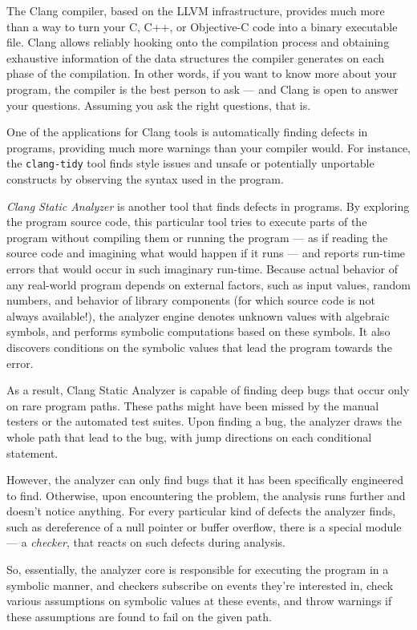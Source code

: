 \documentclass[a4paper,12pt]{article}
\begin{document}
The Clang compiler, based on the LLVM infrastructure, provides much more than a way to turn your C, C++, or Objective-C code into a binary executable file. Clang allows reliably hooking onto the compilation process and obtaining exhaustive information of the data structures the compiler generates on each phase of the compilation. In other words, if you want to know more about your program, the compiler is the best person to ask --- and Clang is open to answer your questions. Assuming you ask the right questions, that is.

One of the applications for Clang tools is automatically finding defects in programs, providing much more warnings than your compiler would. For instance, the \lstinline|clang-tidy| tool finds style issues and unsafe or potentially unportable constructs by observing the syntax used in the program.

\emph{Clang Static Analyzer} is another tool that finds defects in programs. By exploring the program source code, this particular tool tries to execute parts of the program without compiling them or running the program --- as if reading the source code and imagining what would happen if it runs --- and reports run-time errors that would occur in such imaginary run-time. Because actual behavior of any real-world program depends on external factors, such as input values, random numbers, and behavior of library components (for which source code is not always available!), the analyzer engine denotes unknown values with algebraic symbols, and performs symbolic computations based on these symbols. It also discovers conditions on the symbolic values that lead the program towards the error.

As a result, Clang Static Analyzer is capable of finding deep bugs that occur only on rare program paths. These paths might have been missed by the manual testers or the automated test suites. Upon finding a bug, the analyzer draws the whole path that lead to the bug, with jump directions on each conditional statement.

However, the analyzer can only find bugs that it has been specifically engineered to find. Otherwise, upon encountering the problem, the analysis runs further and doesn't notice anything. For every particular kind of defects the analyzer finds, such as dereference of a null pointer or buffer overflow, there is a special module --- a \emph{checker}, that reacts on such defects during analysis.

So, essentially, the analyzer core is responsible for executing the program in a symbolic manner, and checkers subscribe on events they're interested in, check various assumptions on symbolic values at these events, and throw warnings if these assumptions are found to fail on the given path.
\end{document}
